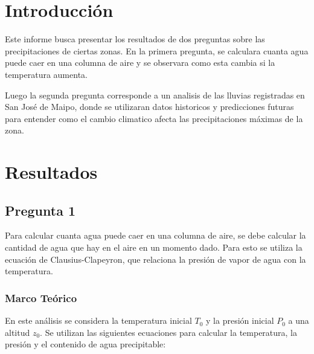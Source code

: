 \documentclass{article}  %
\begin{document}
\newpage
\thispagestyle{empty} %
\tableofcontents
\thispagestyle{plain} %
\thispagestyle{empty} %
\newpage

\setcounter{page}{1}
\section{Introducción}
Este informe busca presentar los resultados de dos preguntas sobre las precipitaciones de ciertas zonas. En la primera pregunta, se calculara cuanta agua puede caer en una columna de aire y se observara como esta cambia si la temperatura aumenta. 

Luego la segunda pregunta corresponde a un analisis de las lluvias registradas en San José de Maipo, donde se utilizaran datos historicos y predicciones futuras para entender como el cambio climatico afecta las precipitaciones máximas de la zona. 

\newpage
\section{Resultados}

\subsection{Pregunta 1}
Para calcular cuanta agua puede caer en una columna de aire, se debe calcular la cantidad de agua que hay en el aire en un momento dado. Para esto se utiliza la ecuación de Clausius-Clapeyron, que relaciona la presión de vapor de agua con la temperatura. \\

\subsubsection{Marco Teórico}

En este análisis se considera la temperatura inicial $T_0$ y la presión inicial $P_0$ a una altitud $z_0$. Se utilizan las siguientes ecuaciones para calcular la temperatura, la presión y el contenido de agua precipitable:
\end{document}
